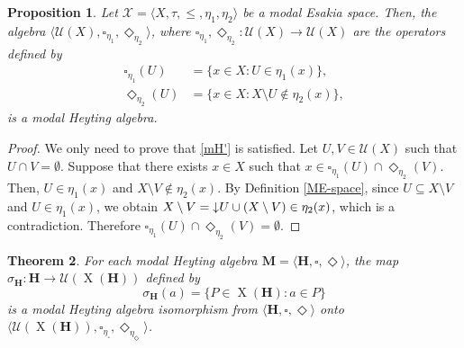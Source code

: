 \documentclass[pdflatex,sn-mathphys-num]{sn-jnl}%
\newcommand{\He}{\mathbf{H}}
\newcommand{\X}[1]{\operatorname{X}(#1)}
\newcommand{\da}[1]{\operatorname{\downarrow}\hspace{-0.5mm}{#1}}
\theoremstyle{thmstyleone}%
\newtheorem{theorem}{Theorem}%
\newtheorem{proposition}[theorem]{Proposition}%
\theoremstyle{thmstyletwo}%
\theoremstyle{thmstylethree}%
\begin{document}
\begin{proposition}
    Let $\mathcal{X}=\langle X,\tau,\leq,\eta_1,\eta_2\rangle$ be a modal Esakia space. Then, the algebra $\langle \mathcal{U}(X),\square_{\eta_1},\Diamond_{\eta_2}\rangle$, where $\square_{\eta_1},\Diamond_{\eta_2}\colon\mathcal{U}(X)\to \mathcal{U}(X)$ are the operators defined by
    \begin{align}\label{squareeta}
        \square_{\eta_1}(U)&= \{ x \in X : U \in \eta_1(x)\},\\ \Diamond_{\eta_2}(U)&=\{ x \in X : X\setminus U \notin \eta_2(x)\},\label{diamondeta}
    \end{align}
    is a modal Heyting algebra.
\end{proposition}
\begin{proof}
    We only need to prove that \eqref{mH'} is satisfied. Let $U,V\in \mathcal{U}(X)$ such that $U\cap V=\emptyset$. Suppose that there exists $x\in X$ such that $x\in \square_{\eta_1}(U)\cap\Diamond_{\eta_2}(V)$. Then, $U\in \eta_1(x)$ and $X\setminus V\notin \eta_2(x)$. By Definition \ref{ME-space}, since $U\subseteq X\setminus V$ and $U\in \eta_1(x)$, we obtain $X\setminus V=\da{U}\cup (X \setminus V)\in \eta_2(x)$, which is a contradiction. Therefore $\square_{\eta_1}(U)\cap\Diamond_{\eta_2}(V)=\emptyset$.
\end{proof}


\begin{theorem}\label{natis}
    For each modal Heyting algebra $\mathbf{M}=\langle \He,\square,\Diamond\rangle$, the map $\sigma_\He \colon \He \to \mathcal{U}(\X{\He})$ defined by
    \[\sigma_\He(a)=\{P\in \X{\He}:a\in P\}\]
    is a modal
Heyting algebra isomorphism from $\langle \He,\square,\Diamond\rangle$ onto $\langle\mathcal{U}(\X{\He}),\square_{\eta_\square},\Diamond_{\eta_\Diamond}\rangle$.
\end{theorem}
\end{document}
